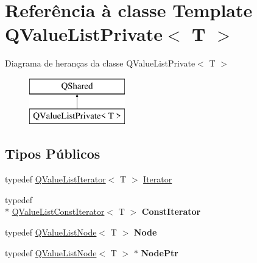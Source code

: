 \hypertarget{class_q_value_list_private}{\section{Referência à classe Template Q\-Value\-List\-Private$<$ T $>$}
\label{class_q_value_list_private}
}
Diagrama de heranças da classe Q\-Value\-List\-Private$<$ T $>$\begin{figure}[H]
\begin{center}
\leavevmode
\includegraphics[height=2.000000cm]{class_q_value_list_private}
\end{center}
\end{figure}
\subsection*{Tipos Públicos}
\begin{DoxyCompactItemize}
\item 
typedef \hyperlink{class_q_value_list_iterator}{Q\-Value\-List\-Iterator}$<$ T $>$ \hyperlink{class_q_value_list_private_a1f559ae0c1d2e8f55846ea5d1ea60977}{Iterator}
\item 
\hypertarget{class_q_value_list_private_ac66ccf2284ef98587f5c446c69ce1010}{typedef \\*
\hyperlink{class_q_value_list_const_iterator}{Q\-Value\-List\-Const\-Iterator}$<$ T $>$ {\bfseries Const\-Iterator}}\label{class_q_value_list_private_ac66ccf2284ef98587f5c446c69ce1010}

\item 
\hypertarget{class_q_value_list_private_aa8436e3cee75d5fac69695eda2b23d17}{typedef \hyperlink{class_q_value_list_node}{Q\-Value\-List\-Node}$<$ T $>$ {\bfseries Node}}\label{class_q_value_list_private_aa8436e3cee75d5fac69695eda2b23d17}

\item 
\hypertarget{class_q_value_list_private_a33149bd41c7bb5c96791c9455305e769}{typedef \hyperlink{class_q_value_list_node}{Q\-Value\-List\-Node}$<$ T $>$ $\ast$ {\bfseries Node\-Ptr}}\label{class_q_value_list_private_a33149bd41c7bb5c96791c9455305e769}

\end{DoxyCompactItemize}
